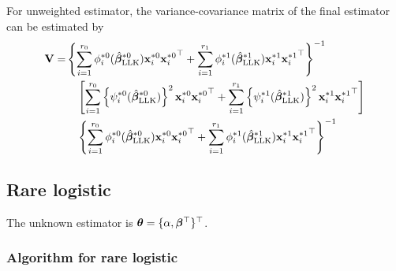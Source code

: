 \documentclass[letterpaper,12pt,hidelinks]{article}
\begin{document}
For unweighted estimator, the variance-covariance matrix of the final estimator can be estimated by
\begin{align*}
    \mathbf{V} = &\left\{\sum_{i=1}^{r_0} \phi_i^{*0}(\hat{\boldsymbol{\beta}}_{\mathrm{LLK}}^{*0}) \mathbf{x}_i^{*0} {\mathbf{x}_i^{*0}}^{\top} + \sum_{i=1}^{r_1} \phi_i^{*1}(\hat{\boldsymbol{\beta}}_{\mathrm{LLK}}^{*1}) \mathbf{x}_i^{*1} {\mathbf{x}_i^{*1}}^{\top}\right\}^{-1}\\
    &\quad \left[\sum_{i=1}^{r_0} \left\{ \psi_i^{*0}(\hat{\boldsymbol{\beta}}_{\mathrm{LLK}}^{*0}) \right\}^2 \mathbf{x}_i^{*0} {\mathbf{x}_i^{*0}}^{\top} + \sum_{i=1}^{r_1} \left\{ \psi_i^{*1}(\hat{\boldsymbol{\beta}}_{\mathrm{LLK}}^{*1})\right\}^2 \mathbf{x}_i^{*1} {\mathbf{x}_i^{*1}}^{\top} \right]\\
    &\quad\left\{\sum_{i=1}^{r_0} \phi_i^{*0}(\hat{\boldsymbol{\beta}}_{\mathrm{LLK}}^{*0}) \mathbf{x}_i^{*0} {\mathbf{x}_i^{*0}}^{\top} + \sum_{i=1}^{r_1} \phi_i^{*1}(\hat{\boldsymbol{\beta}}_{\mathrm{LLK}}^{*1}) \mathbf{x}_i^{*1} {\mathbf{x}_i^{*1}}^{\top}\right\}^{-1}
\end{align*}


\subsection{Rare logistic}

The unknown estimator is $\boldsymbol{\theta} = \{\alpha, \boldsymbol{\beta}^{\top}\}^{\top}$.

\subsubsection{Algorithm for rare logistic}
\end{document}
